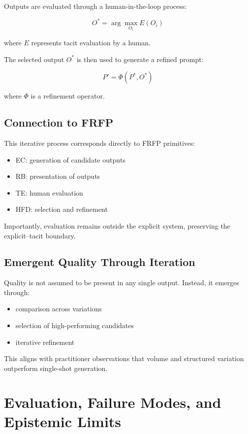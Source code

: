 \documentclass[preprints,article,submit,pdftex,moreauthors,accept]{Definitions/mdpi}
\begin{document}
Outputs are evaluated through a human-in-the-loop process:

\[
O^* = \arg\max_{O_i} E(O_i)
\]

where $E$ represents tacit evaluation by a human.

The selected output $O^*$ is then used to generate a refined prompt:

\[
P' = \Phi(P^*, O^*)
\]

where $\Phi$ is a refinement operator.

\subsection{Connection to FRFP}

This iterative process corresponds directly to FRFP primitives:

\begin{itemize}
    \item EC: generation of candidate outputs
    \item RB: presentation of outputs
    \item TE: human evaluation
    \item HFD: selection and refinement
\end{itemize}

Importantly, evaluation remains outside the explicit system, preserving the explicit–tacit boundary.

\subsection{Emergent Quality Through Iteration}

Quality is not assumed to be present in any single output. Instead, it emerges through:

\begin{itemize}
    \item comparison across variations
    \item selection of high-performing candidates
    \item iterative refinement
\end{itemize}

This aligns with practitioner observations that volume and structured variation outperform single-shot generation.

\section{Evaluation, Failure Modes, and Epistemic Limits}
\end{document}
